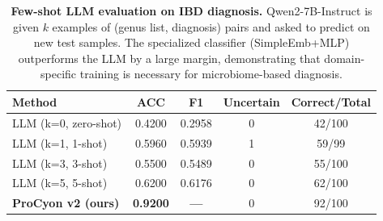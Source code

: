\begin{table}[t]
\centering
\caption{\textbf{Few-shot LLM evaluation on IBD diagnosis.}
Qwen2-7B-Instruct is given $k$ examples of (genus list, diagnosis) pairs
and asked to predict on new test samples. The specialized classifier
(SimpleEmb+MLP) outperforms the LLM by a large margin, demonstrating that
domain-specific training is necessary for microbiome-based diagnosis.}
\label{tab:fewshot}
\begin{tabular}{lcccc}
\toprule
\textbf{Method} & \textbf{ACC} & \textbf{F1} & \textbf{Uncertain} & \textbf{Correct/Total} \\
\midrule
  LLM (k=0, zero-shot) & 0.4200 & 0.2958 & 0 & 42/100 \\
  LLM (k=1, 1-shot) & 0.5960 & 0.5939 & 1 & 59/99 \\
  LLM (k=3, 3-shot) & 0.5500 & 0.5489 & 0 & 55/100 \\
  LLM (k=5, 5-shot) & 0.6200 & 0.6176 & 0 & 62/100 \\
  \midrule
  \textbf{ProCyon v2 (ours)} & \textbf{0.9200} & \textbf{---} & 0 & 92/100 \\
\bottomrule
\end{tabular}
\end{table}